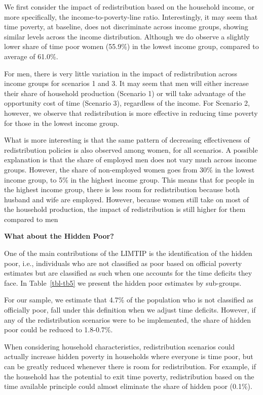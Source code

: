 \documentclass[
  11pt,
]{article}
\begin{document}
We first consider the impact of redistribution based on the household
income, or more specifically, the income-to-poverty-line ratio.
Interestingly, it may seem that time poverty, at baseline, does not
discriminate across income groups, showing similar levels across the
income distribution. Although we do observe a slightly lower share of
time poor women (55.9\%) in the lowest income group, compared to average
of 61.0\%.

For men, there is very little variation in the impact of redistribution
across income groups for scenarios 1 and 3. It may seem that men will
either increase their share of household production (Scenario 1) or will
take advantage of the opportunity cost of time (Scenario 3), regardless
of the income. For Scenario 2, however, we observe that redistribution
is more effective in reducing time poverty for those in the lowest
income group.

What is more interesting is that the same pattern of decreasing
effectiveness of redistribution policies is also observed among women,
for all scenarios. A possible explanation is that the share of employed
men does not vary much across income groups. However, the share of
non-employed women goes from 30\% in the lowest income group, to 5\% in
the highest income group. This means that for people in the highest
income group, there is less room for redistribution because both husband
and wife are employed. However, because women still take on most of the
household production, the impact of redistribution is still higher for
them compared to men

\textbf{What about the Hidden Poor?}

One of the main contributions of the LIMTIP is the identification of the
hidden poor, i.e., individuals who are not classified as poor based on
official poverty estimates but are classified as such when one accounts
for the time deficits they face. In Table~\ref{tbl-tb5} we present the
hidden poor estimates by sub-groups.

For our sample, we estimate that 4.7\% of the population who is not
classified as officially poor, fall under this definition when we adjust
time deficits. However, if any of the redistribution scenarios were to
be implemented, the share of hidden poor could be reduced to 1.8-0.7\%.

When considering household characteristics, redistribution scenarios
could actually increase hidden poverty in households where everyone is
time poor, but can be greatly reduced whenever there is room for
redistribution. For example, if the household has the potential to exit
time poverty, redistribution based on the time available principle could
almost eliminate the share of hidden poor (0.1\%).
\end{document}
